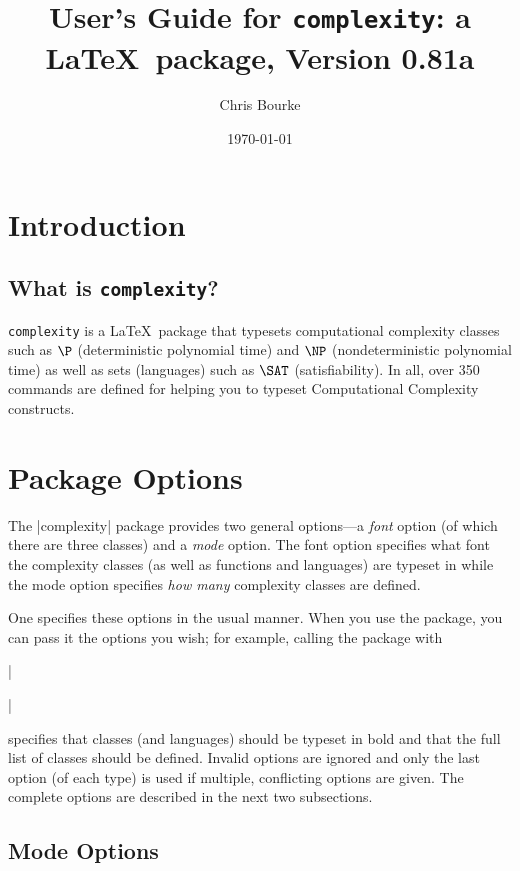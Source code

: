 \documentclass{ltxdoc}
\def\complexityversion{0.81a}
\begin{document}
\title{User's Guide for \texttt{complexity}: a \LaTeX\ package, Version \complexityversion}
\author{Chris Bourke}
\date{\today}

\maketitle

\tableofcontents

\section{Introduction}

\subsection{What is \texttt{complexity}?}

\texttt{complexity} is a \LaTeX\ package that typesets computational
complexity classes such as $\P$ (deterministic polynomial time) and
$\NP$ (nondeterministic polynomial time) as well as sets (languages)
such as $\SAT$ (satisfiability).  In all, over 350 commands are
defined for helping you to typeset Computational Complexity
constructs.

\section{Package Options}

The |complexity| package provides two general options---a
\emph{font} option (of which there are three classes) and a
\emph{mode} option. The font option specifies what font the
complexity classes (as well as functions and languages) are typeset
in while the mode option specifies \emph{how many} complexity
classes are defined.

One specifies these options in the usual manner.  When you use the
package, you can pass it the options you wish; for example, calling
the package with

|\usepackage[bold,full]{complexity}|

specifies that classes (and languages) should be typeset in bold and
that the full list of classes should be defined.  Invalid options
are ignored and only the last option (of each type) is used if
multiple, conflicting options are given.  The complete options are
described in the next two subsections.

\subsection{Mode Options}
\end{document}
